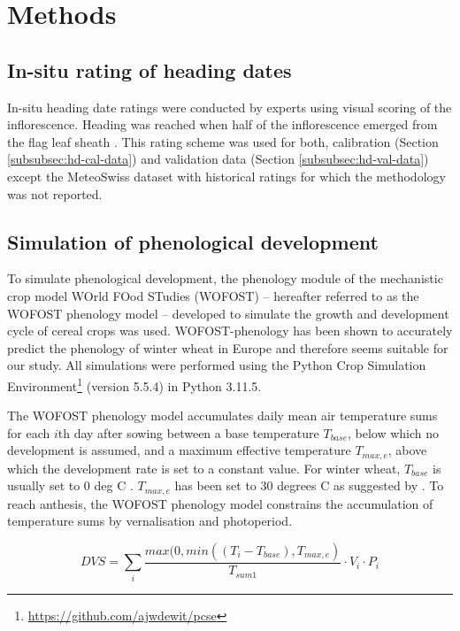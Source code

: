 \section{Methods}
\label{sec:hd-methods}
\subsection{In-situ rating of heading dates}
\label{subsec:rating-method}
In-situ heading date ratings were conducted by experts using visual scoring of the inflorescence. Heading was reached when half of the inflorescence emerged from the flag leaf sheath \citep{meier_growth_2018}. This rating scheme was used for both, calibration (Section \ref{subsubsec:hd-cal-data}) and validation data (Section \ref{subsubsec:hd-val-data}) except the MeteoSwiss dataset with historical ratings for which the methodology was not reported.

\subsection{Simulation of phenological development}
To simulate phenological development, the phenology module of the mechanistic crop model WOrld FOod STudies (WOFOST) -- hereafter referred to as the WOFOST phenology model -- developed to simulate the growth and development cycle of cereal crops \citep{diepen_wofost_1989} was used. WOFOST-phenology has been shown to accurately predict the phenology of winter wheat in Europe \citep{ceglar_improving_2019} and therefore seems suitable for our study.
All simulations were performed using the Python Crop Simulation Environment\footnote{\url{https://github.com/ajwdewit/pcse}} (version 5.5.4) in Python 3.11.5.

The WOFOST phenology model accumulates daily mean air temperature sums for each $i$th day after sowing between a base temperature $T_{base}$, below which no development is assumed, and a maximum effective temperature $T_{max, e}$, above which the development rate is set to a constant value. For winter wheat, $T_{base}$ is usually set to 0 deg C \citep{porter_temperatures_1999}. $T_{max,e}$ has been set to 30 degrees C as suggested by \cite{ceglar_improving_2019}. To reach anthesis, the WOFOST phenology model constrains the accumulation of temperature sums by vernalisation and photoperiod.

\begin{equation}
\label{eq:dvs}
    DVS = \sum_i \frac{max(0, min((T_i-T_{base}), T_{max, e})}{T_{sum1}} \cdot V_{i} \cdot P_{i}
\end{equation}


